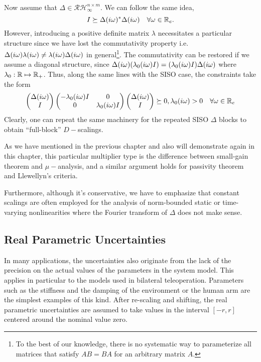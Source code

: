 Now assume that $\Delta\in\mathcal{RH}^{n\times m}_\infty$. We can follow the same idea, 
\[
I\succeq \Delta(i\omega)^*\Delta(i\omega) \quad \forall\omega\in\mathbb{R}_e.
\]
However, introducing a positive definite matrix $\lambda$ necessitates a particular structure
since we have lost the commutativity property i.e. $\Delta(i\omega)\lambda(i\omega) \neq \lambda(i\omega)
\Delta(i\omega)$ in general\footnote{To the best of our knowledge, there is no systematic way to 
parameterize all matrices that satisfy $AB=BA$ for an arbitrary matrix $A$.}. The commutativity 
can be restored if we assume a diagonal structure, since $\Delta(i\omega)(\lambda_0(i\omega)I) = 
(\lambda_0(i\omega)I)\Delta(i\omega)$ where $\lambda_0:\mathbb{R}\mapsto\mathbb{R}_+$. Thus, along the same lines 
with the SISO case, the constraints take the form 
\[
\begin{pmatrix}\Delta(i\omega) \\ I\end{pmatrix}\begin{pmatrix}-\lambda_0(i\omega)I &0\\0 &\lambda_0(i\omega)I\end{pmatrix}\begin{pmatrix}\Delta(i\omega) \\ I\end{pmatrix}
\succeq 0, \lambda_0(i\omega)>0 \quad \forall \omega\in\mathbb{R}_e 
\]
Clearly, one can repeat the same machinery for the repeated SISO $\Delta$ blocks to obtain 
``full-block'' $D-$scalings. 

As we have mentioned in the previous chapter and also will demonstrate again in this chapter, 
this particular multiplier type is the difference between small-gain theorem and $\mu-$analysis,
and a similar argument holds for passivity theorem and Llewellyn's criteria.

Furthermore, although it's conservative, we have to emphasize that constant scalings are often 
employed for the analysis of norm-bounded static or time-varying nonlinearities where the Fourier 
transform of $\Delta$ does not make sense. 



\subsection{Real Parametric Uncertainties}\label{sec:ltvenv}
In many applications, the uncertainties also originate from the lack of the precision
on the actual values of the parameters in the system model. This applies in
particular to the models used in bilateral teleoperation. Parameters such as the
stiffness and the damping of the environment or the human arm are the simplest
examples of this kind. After re-scaling and shifting, the real parametric uncertainties
are assumed to take values in the interval $\left[ -r,r \right]$ centered around
the nominal value zero.

